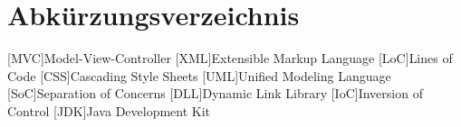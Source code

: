 \chapter*{Abkürzungsverzeichnis}
\label{abkürzungsverzeichnis}

\begin{acronym}
	[MVC]{Model-View-Controller}
	[XML]{Extensible Markup Language}
	[LoC]{Lines of Code}
	[CSS]{Cascading Style Sheets}
	[UML]{Unified Modeling Language}
	[SoC]{Separation of Concerns}
	[DLL]{Dynamic Link Library}
	[IoC]{Inversion of Control}
	[JDK]{Java Development Kit}
\end{acronym}


